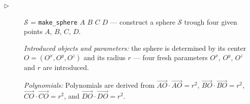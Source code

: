 \documentclass[final,1p,times,authoryear]{elsarticle}
\begin{document}
\begin{description}


\item[$\triangleright$] $\mathcal{S}$ = {\tt make\_sphere} $A$ $B$ $C$
  $D$ --- construct a sphere $\mathcal{S}$ trough four given points
  $A$, $B$, $C$, $D$.
  
 {\em Introduced objects and parameters:} the sphere is determined by
 its center $O = (O^x, O^y, O^z)$ and its radius $r$ --- four fresh
 parameters $O^x$, $O^y$, $O^z$ and $r$ are introduced.

{\em Polynomials:} Polynomials are derived from
$\overrightarrow{AO}\cdot\overrightarrow{AO} = r^2$,
$\overrightarrow{BO}\cdot\overrightarrow{BO} = r^2$,
$\overrightarrow{CO}\cdot\overrightarrow{CO} = r^2$, and
$\overrightarrow{DO}\cdot\overrightarrow{DO} = r^2$.






\end{description}
\end{document}
